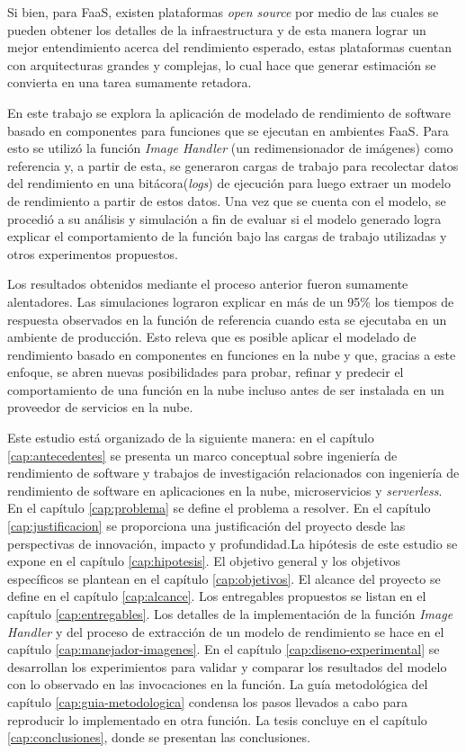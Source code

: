Si bien, para FaaS, existen plataformas \textit{open source} por medio de las cuales se pueden obtener los detalles de la infraestructura y de esta manera lograr un mejor entendimiento acerca del rendimiento esperado, estas plataformas cuentan con arquitecturas grandes y complejas, lo cual hace que generar estimación se convierta en una tarea sumamente retadora.

En este trabajo se explora la aplicación de modelado de rendimiento de software basado en componentes para funciones que se ejecutan en ambientes FaaS. Para esto se utilizó la función \emph{Image Handler} (un redimensionador de imágenes) como referencia y, a partir de esta, se generaron cargas de trabajo para recolectar datos del rendimiento en una bitácora(\textit{logs}) de ejecución para luego extraer un modelo de rendimiento a partir de estos datos. Una vez que se cuenta con el modelo, se procedió a su análisis y simulación a fin de evaluar si el modelo generado logra explicar el comportamiento de la función bajo las cargas de trabajo utilizadas y otros experimentos propuestos.

Los resultados obtenidos mediante el proceso anterior fueron sumamente alentadores. Las simulaciones lograron explicar en más de un 95\% los tiempos de respuesta observados en la función de referencia cuando esta se ejecutaba en un ambiente de producción. Esto releva que es posible aplicar el modelado de rendimiento basado en componentes en funciones en la nube y que, gracias a este enfoque, se abren nuevas posibilidades para probar, refinar y predecir el comportamiento de una función en la nube incluso antes de ser instalada en un proveedor de servicios en la nube.

Este estudio está organizado de la siguiente manera: en el capítulo \ref{cap:antecedentes} se presenta un marco conceptual sobre ingeniería de rendimiento de software y trabajos de investigación relacionados con ingeniería de rendimiento de software en aplicaciones en la nube, microservicios y \emph{serverless}. En el capítulo \ref{cap:problema} se define el problema a resolver. En el capítulo \ref{cap:justificacion} se proporciona una justificación del proyecto desde las perspectivas de innovación, impacto y profundidad.La hipótesis de este estudio se expone en el capítulo \ref{cap:hipotesis}.  El objetivo general y los objetivos específicos se plantean en el capítulo \ref{cap:objetivos}. El alcance del proyecto se define en el capítulo \ref{cap:alcance}. Los entregables propuestos se listan en el capítulo \ref{cap:entregables}. Los detalles de la implementación de la función \emph{Image Handler} y del proceso de extracción de un modelo de rendimiento se hace en el capítulo \ref{cap:manejador-imagenes}. En el capítulo \ref{cap:diseno-experimental} se desarrollan los experimientos para validar y comparar los resultados del modelo con lo observado en las invocaciones en la función. La guía metodológica del capítulo \ref{cap:guia-metodologica} condensa los pasos llevados a cabo para reproducir lo implementado en otra función. La tesis concluye en el capítulo \ref{cap:conclusiones}, donde se presentan las conclusiones.


